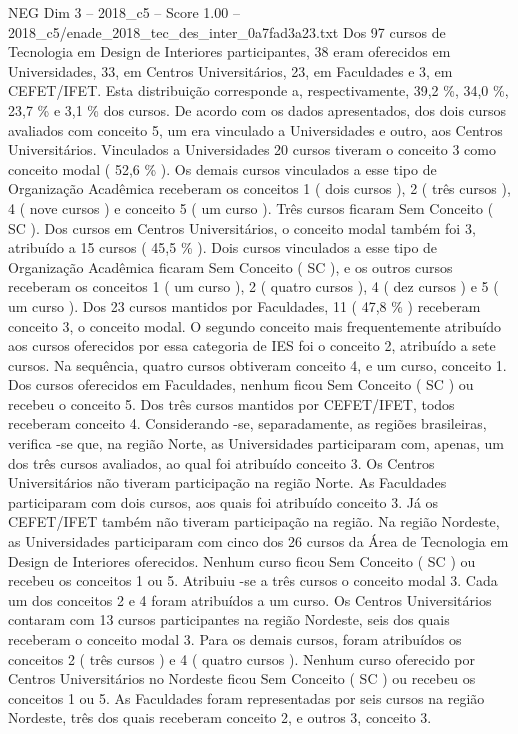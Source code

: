 \begin{textsample}{NEG Dim 3 – 2018\_c5 – Score 1.00 – 2018\_c5/enade\_2018\_tec\_des\_inter\_0a7fad3a23.txt}
Dos 97 cursos de Tecnologia em Design de Interiores participantes, 38 eram oferecidos em Universidades, 33, em Centros Universitários, 23, em Faculdades e 3, em CEFET/IFET.
Esta distribuição corresponde a, respectivamente, 39,2 \%, 34,0 \%, 23,7 \% e 3,1 \% dos cursos.
De acordo com os dados apresentados, dos dois cursos avaliados com conceito 5, um era vinculado a Universidades e outro, aos Centros Universitários.
Vinculados a Universidades 20 cursos tiveram o conceito 3 como conceito modal ( 52,6 \% ).
Os demais cursos vinculados a esse tipo de Organização Acadêmica receberam os conceitos 1 ( dois cursos ), 2 ( três cursos ), 4 ( nove cursos ) e conceito 5 ( um curso ).
Três cursos ficaram Sem Conceito ( SC ).
Dos cursos em Centros Universitários, o conceito modal também foi 3, atribuído a 15 cursos ( 45,5 \% ).
Dois cursos vinculados a esse tipo de Organização Acadêmica ficaram Sem Conceito ( SC ), e os outros cursos receberam os conceitos 1 ( um curso ), 2 ( quatro cursos ), 4 ( dez cursos ) e 5 ( um curso ).
Dos 23 cursos mantidos por Faculdades, 11 ( 47,8 \% ) receberam conceito 3, o conceito modal.
O segundo conceito mais frequentemente atribuído aos cursos oferecidos por essa categoria de IES foi o conceito 2, atribuído a sete cursos.
Na sequência, quatro cursos obtiveram conceito 4, e um curso, conceito 1.
Dos cursos oferecidos em Faculdades, nenhum ficou Sem Conceito ( SC ) ou recebeu o conceito 5.
Dos três cursos mantidos por CEFET/IFET, todos receberam conceito 4.
Considerando -se, separadamente, as regiões brasileiras, verifica -se que, na região Norte, as Universidades participaram com, apenas, um dos três cursos avaliados, ao qual foi atribuído conceito 3.
Os Centros Universitários não tiveram participação na região Norte.
As Faculdades participaram com dois cursos, aos quais foi atribuído conceito 3.
Já os CEFET/IFET também não tiveram participação na região.
Na região Nordeste, as Universidades participaram com cinco dos 26 cursos da Área de Tecnologia em Design de Interiores oferecidos.
Nenhum curso ficou Sem Conceito ( SC ) ou recebeu os conceitos 1 ou 5.
Atribuiu -se a três cursos o conceito modal 3.
Cada um dos conceitos 2 e 4 foram atribuídos a um curso.
Os Centros Universitários contaram com 13 cursos participantes na região Nordeste, seis dos quais receberam o conceito modal 3.
Para os demais cursos, foram atribuídos os conceitos 2 ( três cursos ) e 4 ( quatro cursos ).
Nenhum curso oferecido por Centros Universitários no Nordeste ficou Sem Conceito ( SC ) ou recebeu os conceitos 1 ou 5.
As Faculdades foram representadas por seis cursos na região Nordeste, três dos quais receberam conceito 2, e outros 3, conceito 3.

\end{textsample}
